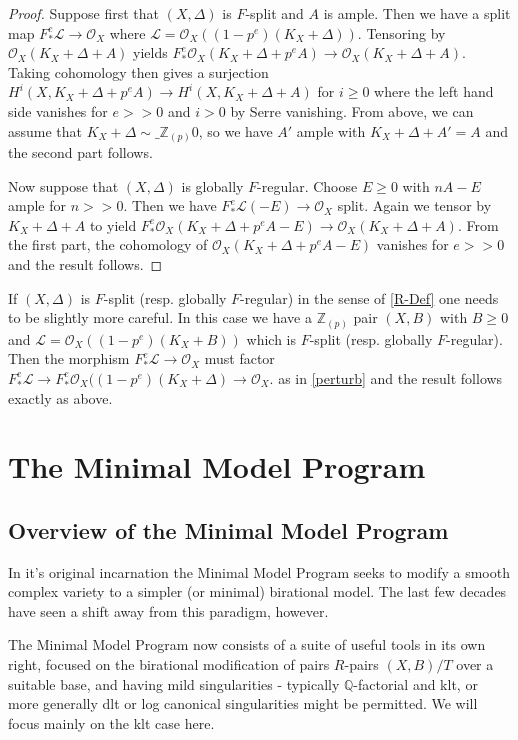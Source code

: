 \documentclass[a4paper,12pt]{book}
\newcommand{\Fe}[1][e]{F^{#1}_{*}}
\newcommand{\ox}[1][X]{\mathcal{O}_{#1}}
\newcommand{\zp}{\mathbb{Z}_{(p)}}
\begin{document}
\begin{proof}
	
	Suppose first that $(X,\Delta)$ is $F$-split and $A$ is ample. Then we have a split map $\Fe \mathcal{L} \to \ox$ where $\mathcal{L}=\ox((1-p^{e})(K_{X}+\Delta))$. Tensoring by $\ox(K_{X}+\Delta+A)$ yields $\Fe\ox(K_{X}+\Delta+p^{e}A) \to \ox(K_{X}+\Delta+A)$. Taking cohomology then gives a surjection $H^{i}(X,K_{X}+\Delta+p^{e}A) \to H^{i}(X,K_{X}+\Delta+A)$ for $i \geq 0$ where the left hand side vanishes for $e>>0$ and $i>0$ by Serre vanishing. From above, we can assume that $K_{X}+\Delta\sim\_{\zp} 0$, so we have $A'$ ample with $K_{X}+\Delta+A'=A$ and the second part follows.
	
	Now suppose that $(X,\Delta)$ is globally $F$-regular. Choose $E\geq 0$ with $nA-E$ ample for $n>>0$. Then we have $\Fe\mathcal{L}(-E) \to \ox$ split. Again we tensor by $K_{X}+\Delta+A$ to yield $\Fe \ox(K_{X}+\Delta+p^{e}A-E) \to \ox(K_{X}+\Delta+A)$. From the first part, the cohomology of $\ox(K_{X}+\Delta+p^{e}A-E)$ vanishes for $e>>0$ and the result follows.
		
\end{proof}

If $(X,\Delta)$ is $F$-split (resp. globally $F$-regular) in the sense of \autoref{R-Def} one needs to be slightly more careful. In this case we have a $\zp$ pair $(X,B)$ with $B \geq 0$ and $\mathcal{L}=\ox((1-p^{e})(K_{X}+B))$ which is $F$-split (resp. globally $F$-regular). Then the morphism $\Fe \mathcal{L} \to \ox$ must factor $\Fe \mathcal{L} \to \Fe\ox((1-p^{e})(K_{X}+\Delta) \to \ox$.  as in \autoref{perturb} and the result follows exactly as above.

\section{The Minimal Model Program}

\subsection{Overview of the Minimal Model Program}\label{overview}
In it's original incarnation the Minimal Model Program seeks to modify a smooth complex variety to a simpler (or minimal) birational model. The last few decades have seen a shift away from this paradigm, however. 

The Minimal Model Program now consists of a suite of useful tools in its own right, focused on the birational modification of pairs $R$-pairs $(X,B)/T$ over a suitable base, and having mild singularities - typically $\mathbb{Q}$-factorial and klt, or more generally dlt or log canonical singularities might be permitted. We will focus mainly on the klt case here.
\end{document}
